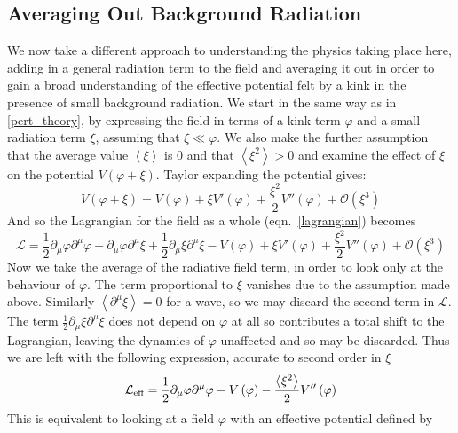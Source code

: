 \documentclass[11pt, oneside]{article}  	%
\numberwithin{equation}{section}
\begin{document}
\subsection{Averaging Out Background Radiation} \label{avg_out}
We now take a different approach to understanding the physics taking place here,  adding in a general radiation term to the field and averaging it out in order to gain a broad understanding of the effective potential felt by a kink in the presence of small background radiation. We start in the same way as in \textsection \ref{pert_theory}, by expressing the field in terms of a kink term $\varphi$ and a small radiation term $\xi$, assuming that $\xi \ll \varphi$. We also make the further assumption that the average value $\left \langle\xi\right \rangle$ is 0 and that $\left \langle\xi ^ 2\right \rangle > 0$ and examine the effect of $\xi$ on the potential $V(\varphi+\xi)$. Taylor expanding the potential gives:
\begin{equation}
V\left ( \varphi+\xi \right ) = V\left ( \varphi \right ) + \xi V'\left ( \varphi \right ) + \frac{\xi^2}{2}V''\left ( \varphi \right ) + \mathcal{O}(\xi^3)
\end{equation}
And so the Lagrangian for the field as a whole (eqn.~\ref{lagrangian}) becomes
\begin{equation}
\mathcal{L} = \frac{1}{2} \partial_\mu \varphi \partial^\mu \varphi + \partial_\mu \varphi \partial^\mu \xi + \frac{1}{2} \partial_\mu \xi\partial^\mu \xi- V\left ( \varphi \right ) + \xi V'\left ( \varphi \right ) + \frac{\xi^2}{2}V''\left ( \varphi \right ) + \mathcal{O}(\xi^3)
\end{equation} 
Now we take the average of the radiative field term, in order to look only at the behaviour of $\varphi$. The term proportional to $\xi$ vanishes due to the assumption made above. Similarly $\left \langle \partial^\mu \xi\right \rangle = 0$ for a wave, so we may discard the second term in $\mathcal{L}$. The term $ \frac{1}{2} \partial_\mu \xi\partial^\mu \xi$ does not depend on $\varphi$ at all so contributes a total shift to the Lagrangian, leaving the dynamics of $\varphi$ unaffected and so may be discarded. Thus we are left with the following expression, accurate to second order in $\xi$ 
\begin{equation}
\mathcal{L}_{\textup{eff}} = \frac{1}{2} \partial_\mu \varphi \partial^\mu \varphi - V\left ( \varphi \right ) - \frac{\left \langle \xi^2 \right \rangle}{2}V''\left ( \varphi \right ) 
\end{equation} 
This is equivalent to looking at a field $\varphi$ with an effective potential defined by
\end{document}
